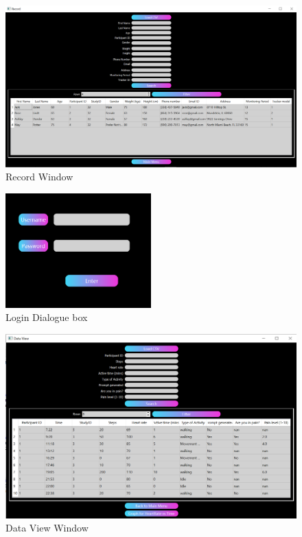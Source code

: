 \documentclass[12pt, titlepage]{article}
\begin{document}
\begin{figure}[H]
	\begin{center}
		 \includegraphics[width=1\textwidth]{Record}
		\caption{Record Window}
		\label{Record} 
	\end{center}
\end{figure}

\begin{figure}[H]
	\begin{center}
		 \includegraphics[width=0.5\textwidth]{login}
		\caption{Login Dialogue box}
		\label{Login} 
	\end{center}
\end{figure}

\begin{figure}[H]
	\begin{center}
		 \includegraphics[width=1\textwidth]{DataView}
		\caption{Data View Window}
		\label{DataView} 
	\end{center}
\end{figure}
\end{document}
